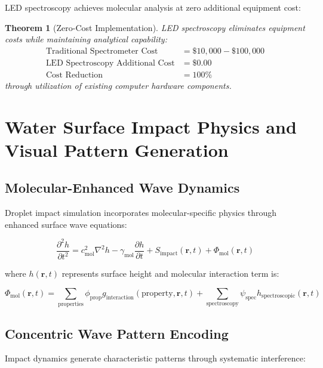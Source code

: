\documentclass[12pt,a4paper]{article}
\newtheorem{theorem}{Theorem}[section]
\begin{document}
LED spectroscopy achieves molecular analysis at zero additional equipment cost:

\begin{theorem}[Zero-Cost Implementation]
LED spectroscopy eliminates equipment costs while maintaining analytical capability:
\begin{align}
\text{Traditional Spectrometer Cost} &= \$10,000 - \$100,000 \\
\text{LED Spectroscopy Additional Cost} &= \$0.00 \\
\text{Cost Reduction} &= 100\%
\end{align}
through utilization of existing computer hardware components.
\end{theorem}

\section{Water Surface Impact Physics and Visual Pattern Generation}

\subsection{Molecular-Enhanced Wave Dynamics}

Droplet impact simulation incorporates molecular-specific physics through enhanced surface wave equations:

\begin{equation}
\frac{\partial^2 h}{\partial t^2} = c_{\text{mol}}^2 \nabla^2 h - \gamma_{\text{mol}} \frac{\partial h}{\partial t} + S_{\text{impact}}(\mathbf{r}, t) + \Phi_{\text{mol}}(\mathbf{r}, t)
\end{equation}

where $h(\mathbf{r}, t)$ represents surface height and molecular interaction term is:

\begin{equation}
\Phi_{\text{mol}}(\mathbf{r}, t) = \sum_{\text{properties}} \phi_{\text{prop}} g_{\text{interaction}}(\text{property}, \mathbf{r}, t) + \sum_{\text{spectroscopy}} \psi_{\text{spec}} h_{\text{spectroscopic}}(\mathbf{r}, t)
\end{equation}

\subsection{Concentric Wave Pattern Encoding}

Impact dynamics generate characteristic patterns through systematic interference:
\end{document}
